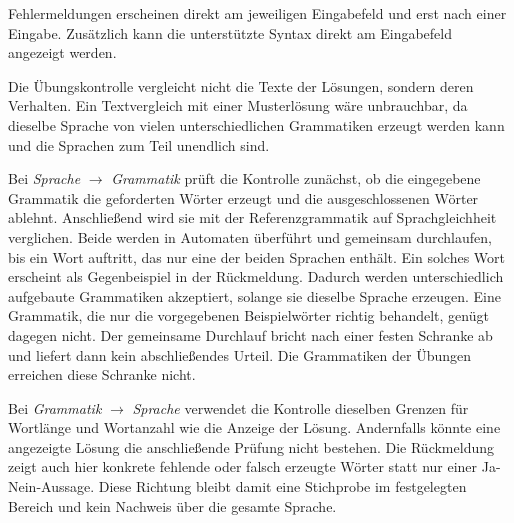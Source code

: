 Fehlermeldungen erscheinen direkt am jeweiligen Eingabefeld und erst nach einer
Eingabe.
Zusätzlich kann die unterstützte Syntax direkt am Eingabefeld angezeigt werden.


Die Übungskontrolle vergleicht nicht die Texte der Lösungen, sondern deren Verhalten.
Ein Textvergleich mit einer Musterlösung wäre unbrauchbar, da dieselbe Sprache von
vielen unterschiedlichen Grammatiken erzeugt werden kann und die Sprachen zum Teil
unendlich sind.

Bei \emph{Sprache} $\rightarrow$ \emph{Grammatik} prüft die Kontrolle zunächst, 
ob die eingegebene Grammatik die geforderten Wörter erzeugt und die ausgeschlossenen Wörter ablehnt. 
Anschließend wird sie mit der Referenzgrammatik auf Sprachgleichheit verglichen. 
Beide werden in Automaten überführt und gemeinsam durchlaufen, bis ein Wort auftritt, 
das nur eine der beiden Sprachen enthält.
Ein solches Wort erscheint als Gegenbeispiel in der Rückmeldung.
Dadurch werden unterschiedlich aufgebaute Grammatiken akzeptiert, solange sie
dieselbe Sprache erzeugen. Eine Grammatik, die nur die vorgegebenen Beispielwörter
richtig behandelt, genügt dagegen nicht.
Der gemeinsame Durchlauf bricht nach einer festen Schranke ab und liefert dann kein
abschließendes Urteil. Die Grammatiken der Übungen erreichen diese Schranke nicht.

Bei \emph{Grammatik} $\rightarrow$ \emph{Sprache} verwendet die Kontrolle dieselben
Grenzen für Wortlänge und Wortanzahl wie die Anzeige der Lösung.
Andernfalls könnte eine angezeigte Lösung die anschließende Prüfung nicht bestehen.
Die Rückmeldung zeigt auch hier konkrete fehlende oder falsch erzeugte Wörter statt
nur einer Ja-Nein-Aussage.
Diese Richtung bleibt damit eine Stichprobe im festgelegten Bereich und kein Nachweis
über die gesamte Sprache.

